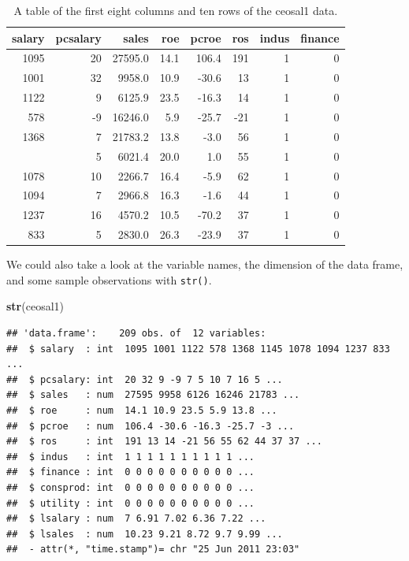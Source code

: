 \documentclass[]{book}
\newenvironment{Shaded}{\begin{snugshade}}{\end{snugshade}}
\newcommand{\KeywordTok}[1]{\textcolor[rgb]{0.13,0.29,0.53}{\textbf{#1}}}
\newcommand{\NormalTok}[1]{#1}
\begin{document}
\begin{table}

\caption{\label{tab:unnamed-chunk-7}A table of the first eight columns and ten rows of the ceosal1 data.}
\centering
\begin{tabular}[t]{rrrrrrrr}
\toprule
salary & pcsalary & sales & roe & pcroe & ros & indus & finance\\
\midrule
1095 & 20 & 27595.0 & 14.1 & 106.4 & 191 & 1 & 0\\
1001 & 32 & 9958.0 & 10.9 & -30.6 & 13 & 1 & 0\\
1122 & 9 & 6125.9 & 23.5 & -16.3 & 14 & 1 & 0\\
578 & -9 & 16246.0 & 5.9 & -25.7 & -21 & 1 & 0\\
1368 & 7 & 21783.2 & 13.8 & -3.0 & 56 & 1 & 0\\
\addlinespace
1145 & 5 & 6021.4 & 20.0 & 1.0 & 55 & 1 & 0\\
1078 & 10 & 2266.7 & 16.4 & -5.9 & 62 & 1 & 0\\
1094 & 7 & 2966.8 & 16.3 & -1.6 & 44 & 1 & 0\\
1237 & 16 & 4570.2 & 10.5 & -70.2 & 37 & 1 & 0\\
833 & 5 & 2830.0 & 26.3 & -23.9 & 37 & 1 & 0\\
\bottomrule
\end{tabular}
\end{table}

We could also take a look at the variable names, the dimension of the
data frame, and some sample observations with \texttt{str()}.

\begin{Shaded}
\begin{Highlighting}[]
\KeywordTok{str}\NormalTok{(ceosal1)}
\end{Highlighting}
\end{Shaded}

\begin{verbatim}
## 'data.frame':    209 obs. of  12 variables:
##  $ salary  : int  1095 1001 1122 578 1368 1145 1078 1094 1237 833 ...
##  $ pcsalary: int  20 32 9 -9 7 5 10 7 16 5 ...
##  $ sales   : num  27595 9958 6126 16246 21783 ...
##  $ roe     : num  14.1 10.9 23.5 5.9 13.8 ...
##  $ pcroe   : num  106.4 -30.6 -16.3 -25.7 -3 ...
##  $ ros     : int  191 13 14 -21 56 55 62 44 37 37 ...
##  $ indus   : int  1 1 1 1 1 1 1 1 1 1 ...
##  $ finance : int  0 0 0 0 0 0 0 0 0 0 ...
##  $ consprod: int  0 0 0 0 0 0 0 0 0 0 ...
##  $ utility : int  0 0 0 0 0 0 0 0 0 0 ...
##  $ lsalary : num  7 6.91 7.02 6.36 7.22 ...
##  $ lsales  : num  10.23 9.21 8.72 9.7 9.99 ...
##  - attr(*, "time.stamp")= chr "25 Jun 2011 23:03"
\end{verbatim}
\end{document}

